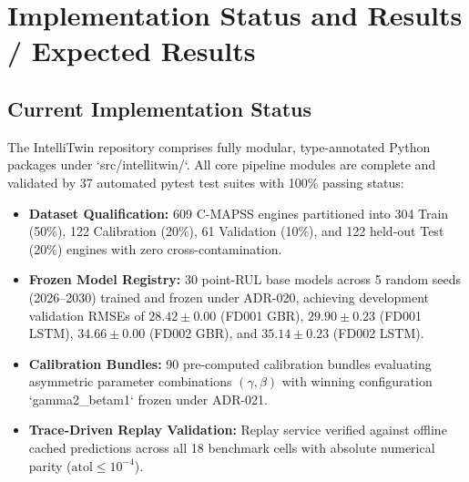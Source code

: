 \documentclass[12pt,a4paper]{article}
\begin{document}
\section{Implementation Status and Results / Expected Results}

\subsection{Current Implementation Status}
The IntelliTwin repository comprises fully modular, type-annotated Python packages under `src/intellitwin/`. All core pipeline modules are complete and validated by 37 automated pytest test suites with 100\% passing status:
\begin{itemize}[leftmargin=1.5em]
    \item \textbf{Dataset Qualification:} 609 C-MAPSS engines partitioned into 304 Train (50\%), 122 Calibration (20\%), 61 Validation (10\%), and 122 held-out Test (20\%) engines with zero cross-contamination.
    \item \textbf{Frozen Model Registry:} 30 point-RUL base models across 5 random seeds (2026--2030) trained and frozen under ADR-020, achieving development validation RMSEs of $28.42 \pm 0.00$ (FD001 GBR), $29.90 \pm 0.23$ (FD001 LSTM), $34.66 \pm 0.00$ (FD002 GBR), and $35.14 \pm 0.23$ (FD002 LSTM).
    \item \textbf{Calibration Bundles:} 90 pre-computed calibration bundles evaluating asymmetric parameter combinations $(\gamma, \beta)$ with winning configuration `gamma2_betam1` frozen under ADR-021.
    \item \textbf{Trace-Driven Replay Validation:} Replay service verified against offline cached predictions across all 18 benchmark cells with absolute numerical parity ($\text{atol} \le 10^{-4}$).
\end{itemize}
\end{document}
